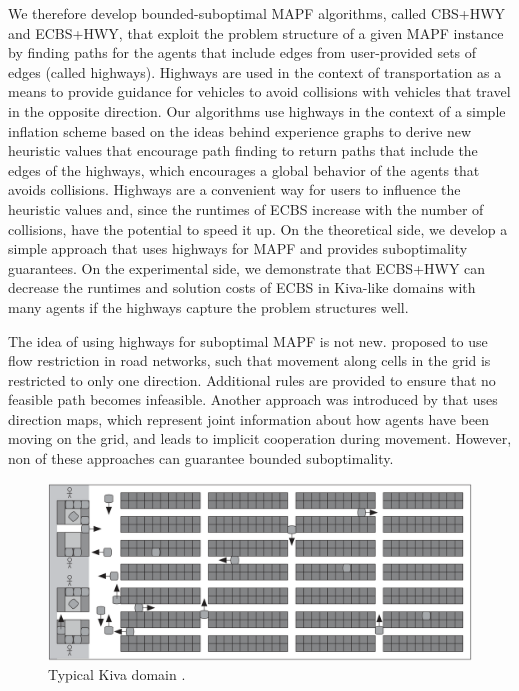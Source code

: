 \documentclass[letterpaper]{article}
\theoremstyle{definition}
\begin{document}
We therefore develop bounded-suboptimal MAPF algorithms, called CBS+HWY and
ECBS+HWY, that exploit the problem structure of a given MAPF instance by
finding paths for the agents that include edges from user-provided sets of
edges (called highways).  Highways are used in the context of transportation
as a means to provide guidance for vehicles to avoid collisions with vehicles
that travel in the opposite direction. Our algorithms use highways in the
context of a simple inflation scheme based on the ideas behind experience
graphs \cite{PCCL:RSS:12} to derive new heuristic values that encourage path
finding to return paths that include the edges of the highways, which
encourages a global behavior of the agents that avoids collisions. Highways
are a convenient way for users to influence the heuristic values and, since
the runtimes of ECBS increase with the number of collisions, have the
potential to speed it up. On the theoretical side, we develop a simple
approach that uses highways for MAPF and provides suboptimality guarantees. On
the experimental side, we demonstrate that ECBS+HWY can decrease the runtimes
and solution costs of ECBS in Kiva-like domains with many agents if the
highways capture the problem structures well.

The idea of using highways for suboptimal MAPF is not new. \cite{WB:ICAPS:08} proposed to use flow restriction in road networks, such that movement along cells in the grid is restricted to only one direction. Additional rules are provided to ensure that no feasible path becomes infeasible.
Another approach was introduced by \cite{JS:AIIDE:08} that uses direction maps, which represent joint information about how agents have been moving on the grid, and leads to implicit cooperation during movement. However, non of these approaches can guarantee bounded suboptimality.

\begin{figure}[t]
  \centering
	\includegraphics[width=\columnwidth]{Figs/kiva.png}
  \caption{Typical Kiva domain \cite{WDM:AIM:08}.}
  \label{kiva_fig}
\end{figure}
\end{document}
